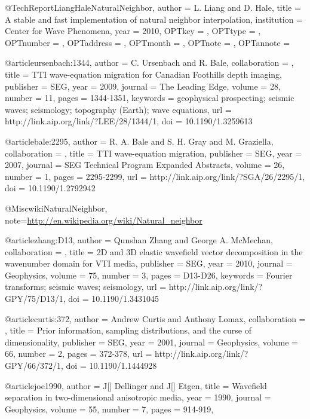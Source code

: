 {@TechReport{LiangHaleNaturalNeighbor,
  author = 	 {L. Liang and D. Hale},
  title = 	 {A stable and fast implementation of natural neighbor
                  interpolation},
  institution =  {Center for Wave Phenomena},
  year = 	 {2010},
  OPTkey = 	 {},
  OPTtype = 	 {},
  OPTnumber = 	 {},
  OPTaddress = 	 {},
  OPTmonth = 	 {},
  OPTnote = 	 {},
  OPTannote = 	 {}
}


@article{ursenbach:1344,
author = {C. Ursenbach and R. Bale},
collaboration = {},
title = {TTI wave-equation migration for Canadian Foothills depth imaging},
publisher = {SEG},
year = {2009},
journal = {The Leading Edge},
volume = {28},
number = {11},
pages = {1344-1351},
keywords = {geophysical prospecting; seismic waves; seismology; topography (Earth); wave equations},
url = {http://link.aip.org/link/?LEE/28/1344/1},
doi = {10.1190/1.3259613}
}







@article{bale:2295,
author = {R. A. Bale and S. H. Gray and M. Graziella},
collaboration = {},
title = {TTI wave-equation migration},
publisher = {SEG},
year = {2007},
journal = {SEG Technical Program Expanded Abstracts},
volume = {26},
number = {1},
pages = {2295-2299},
url = {http://link.aip.org/link/?SGA/26/2295/1},
doi = {10.1190/1.2792942}
}


@Misc{wikiNaturalNeighbor,
  note={\url{http://en.wikipedia.org/wiki/Natural_neighbor}  }
}



@article{zhang:D13,
author = {Qunshan Zhang and George A. McMechan},
collaboration = {},
title = {2{D} and 3{D} elastic wavefield vector decomposition in the wavenumber domain for VTI media},
publisher = {SEG},
year = {2010},
journal = {Geophysics},
volume = {75},
number = {3},
pages = {D13-D26},
keywords = {Fourier transforms; seismic waves; seismology},
url = {http://link.aip.org/link/?GPY/75/D13/1},
doi = {10.1190/1.3431045}
}



@article{curtis:372,
author = {Andrew Curtis and Anthony Lomax},
collaboration = {},
title = {Prior information, sampling distributions, and the curse of dimensionality},
publisher = {SEG},
year = {2001},
journal = {Geophysics},
volume = {66},
number = {2},
pages = {372-378},
url = {http://link.aip.org/link/?GPY/66/372/1},
doi = {10.1190/1.1444928}
}

@article{joe1990,
author = {J[] Dellinger and J[] Etgen},
title = {Wavefield separation in two-dimensional anisotropic media},
year = {1990},
journal = {Geophysics},
volume = {55},
number = {7},
pages = {914-919},
}

}

